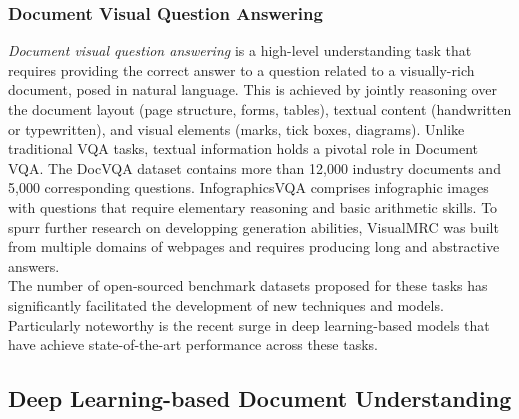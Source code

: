 \subsubsection{Document Visual Question Answering}


\textit{Document visual question answering} is a high-level understanding task that requires providing the correct answer to a question related to a visually-rich document, posed in natural language. This is achieved by jointly reasoning over the document layout (page structure, forms, tables), textual content (handwritten or typewritten), and visual elements (marks, tick boxes, diagrams). Unlike traditional \ac{VQA} tasks, textual information holds a pivotal role in \ac{Document VQA}. The DocVQA dataset \citep{mathew2021docvqa} contains more than 12,000 industry documents and 5,000 corresponding questions. InfographicsVQA \citep{mathew2022infographicvqa} comprises infographic images with questions that require elementary reasoning and basic arithmetic skills. To spurr further research on developping generation abilities, VisualMRC \citep{tanaka2021visualmrc} was built from multiple domains of webpages and requires producing long and abstractive answers. \\



The number of open-sourced benchmark datasets proposed for these tasks has significantly facilitated the development of new techniques and models. Particularly noteworthy is the recent surge in deep learning-based models that have achieve state-of-the-art performance across these tasks.

\subsection{Deep Learning-based Document Understanding}

